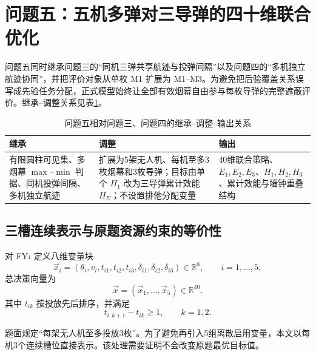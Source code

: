 \section{问题五：五机多弹对三导弹的四十维联合优化}

问题五同时继承问题三的“同机三弹共享航迹与投弹间隔”以及问题四的“多机独立航迹协同”，并把评价对象从单枚 M1 扩展为 M1--M3。为避免把后验覆盖关系误写成先验任务分配，正式模型始终让全部有效烟幕自由参与每枚导弹的完整遮蔽评价。继承--调整关系见表\ref{tab:q5-inherit}。

\begin{table}[tbp]
\centering
\caption{问题五相对问题三、问题四的继承--调整--输出关系}
\label{tab:q5-inherit}
\small
\begin{tabularx}{\textwidth}{p{} X X}
\toprule
\textbf{继承} & \textbf{调整} & \textbf{输出} \\
\midrule
有限圆柱可见集、多烟幕 $\max$--$\min$ 判据、同机投弹间隔、多机独立航迹 & 扩展为5架无人机、每机至多3枚烟幕和3枚导弹；目标由单个 $H_1$ 改为三导弹累计效能 $H_\Sigma$；不设置排他分配变量 & 40维联合策略、$E_1,E_2,E_3$、$H_1,H_2,H_3$、累计效能与墙钟重叠结构 \\
\bottomrule
\end{tabularx}
\end{table}

\subsection{三槽连续表示与原题资源约束的等价性}
对 FY$i$ 定义八维变量块
\begin{equation}
\vec x_i=(\theta_i,v_i,t_{i1},t_{i2},t_{i3},\delta_{i1},\delta_{i2},\delta_{i3})\in\mathbb R^8,
\qquad i=1,\ldots,5,
\label{eq:q5-block}
\end{equation}
总决策向量为
\begin{equation}
\vec x=(\vec x_1,\ldots,\vec x_5)\in\mathbb R^{40}.
\label{eq:q5-40d}
\end{equation}
其中 $t_{ik}$ 按投放先后排序，并满足
\begin{equation}
t_{i,k+1}-t_{ik}\ge1,
\qquad k=1,2.
\label{eq:q5-gap}
\end{equation}

题面规定“每架无人机至多投放3枚”。为了避免再引入5组离散启用变量，本文以每机3个连续槽位直接表示。该处理需要证明不会改变原题最优目标值。

